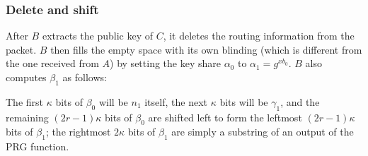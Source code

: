 \subsubsection{Delete and shift}
After $B$ extracts the public key of $C$, it deletes the routing information from the packet. $B$ then fills the empty space with its own blinding (which is different from the one received from $A$) by setting the key share $\alpha_0$ to $\alpha_1=g^{xb_0}$. $B$ also computes $\beta_1$ as follows:

The first $\kappa$ bits of $\beta_0$ will be $n_{1}$ itself, the next $\kappa$ bits will be $\gamma_{1}$, and the remaining $(2r-1)\kappa$ bits of $\beta_0$ are shifted left to form the leftmost $(2r-1)\kappa$ bits of $\beta_{1}$; the rightmost $2\kappa$ bits of $\beta_{1}$ are simply a substring of an output of the PRG function.

